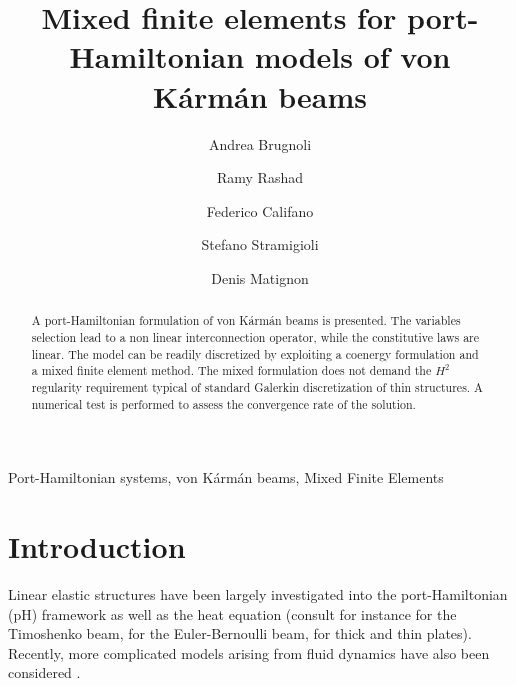 \documentclass{ifacconf}
\begin{document}
\begin{frontmatter}

\title{Mixed finite elements for port-Hamiltonian models of von K\'arm\'an beams} 


\author[UT]{Andrea Brugnoli}
\author[UT]{Ramy Rashad}
\author[UT]{Federico Califano}
\author[UT]{Stefano Stramigioli}
\author[ISAE]{Denis Matignon}
\address[UT]{University of Twente, Enschede, The Netherlands. \\
	a.brugnoli@utwente.nl, s.stramigioli@utwente.nl }

\address[ISAE]{ISAE-SUPAERO, Universit\'e de Toulouse, France. \\
	denis.matignon@isae.fr}

\begin{abstract}
A port-Hamiltonian formulation of von K\'arm\'an beams is presented. The variables selection lead to a non linear interconnection operator, while the constitutive laws are linear. The model can be readily discretized by exploiting a coenergy formulation and a mixed finite element method. The mixed formulation does not demand the $H^2$ regularity requirement typical of standard Galerkin discretization of thin structures. A numerical test is performed to assess the convergence rate of the solution. 
\end{abstract}

\begin{keyword}
Port-Hamiltonian systems, von K\'arm\'an beams, Mixed Finite Elements
\end{keyword}

\end{frontmatter}

\section{Introduction}

Linear elastic structures have been largely investigated into the port-Hamiltonian (pH) framework as well as the heat equation (consult for instance \cite{macchelli2004timo} for the Timoshenko beam, \cite{aoues2017modeling} for the Euler-Bernoulli beam, \cite{brugnoli2019mindlin,brugnoli2019kirchhoff} for thick and thin plates). Recently, more complicated models arising from fluid dynamics have also been considered \citep{cardoso2019port,cardoso2020swe,rashad2021port1,rashad2021port2,califano2021geometric,altmann2017}. \\
\end{document}
